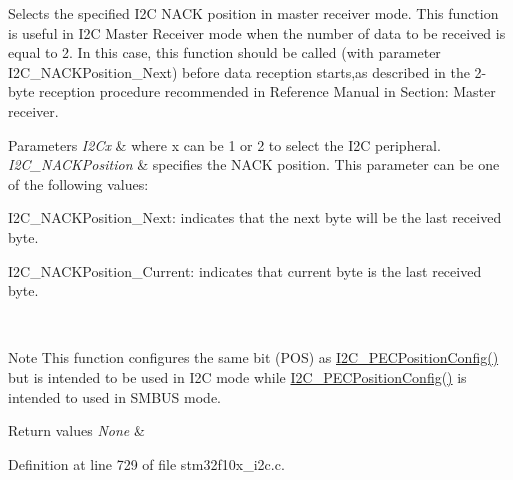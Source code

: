 Selects the specified I2C N\+A\+CK position in master receiver mode. This function is useful in I2C Master Receiver mode when the number of data to be received is equal to 2. In this case, this function should be called (with parameter I2\+C\+\_\+\+N\+A\+C\+K\+Position\+\_\+\+Next) before data reception starts,as described in the 2-\/byte reception procedure recommended in Reference Manual in Section\+: Master receiver. 


\begin{DoxyParams}{Parameters}
{\em I2\+Cx} & where x can be 1 or 2 to select the I2C peripheral. \\
\hline
{\em I2\+C\+\_\+\+N\+A\+C\+K\+Position} & specifies the N\+A\+CK position. This parameter can be one of the following values\+: \begin{DoxyItemize}
\item I2\+C\+\_\+\+N\+A\+C\+K\+Position\+\_\+\+Next\+: indicates that the next byte will be the last received byte. \item I2\+C\+\_\+\+N\+A\+C\+K\+Position\+\_\+\+Current\+: indicates that current byte is the last received byte.\end{DoxyItemize}
\\
\hline
\end{DoxyParams}
\begin{DoxyNote}{Note}
This function configures the same bit (P\+OS) as \hyperlink{group___i2_c___private___functions_ga5d0f939bdd45542502827bf408f24161}{I2\+C\+\_\+\+P\+E\+C\+Position\+Config()} but is intended to be used in I2C mode while \hyperlink{group___i2_c___private___functions_ga5d0f939bdd45542502827bf408f24161}{I2\+C\+\_\+\+P\+E\+C\+Position\+Config()} is intended to used in S\+M\+B\+US mode.
\end{DoxyNote}

\begin{DoxyRetVals}{Return values}
{\em None} & \\
\hline
\end{DoxyRetVals}


Definition at line 729 of file stm32f10x\+\_\+i2c.\+c.

\mbox{\label{group___i2_c___exported___functions_ga7be2cc634a613c8e3539137e897a22df}} 
